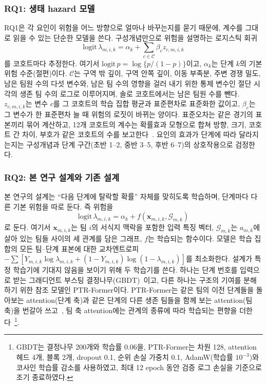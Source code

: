 \subsubsection{RQ1: 생태 hazard 모델}
\label{sec:method:rq1}
RQ1은 각 요인이 위험을 어느 방향으로 얼마나 바꾸는지를 묻기 때문에, 계수를 그대로 읽을 수 있는 단순한 모델을 쓴다.
구성개념만으로 위험을 설명하는 로지스틱 회귀
\begin{equation}
\mathrm{logit}\,\lambda_{m,i,k}=\alpha_k+\textstyle\sum_{c\in\mathcal{C}}\beta_c z_{c,m,i,k}
\label{eq:ehm}
\end{equation}
를 코호트마다 추정한다.
여기서 $\mathrm{logit}\,p=\log\{p/(1-p)\}$이고, $\alpha_k$는 단계 $k$의 기본 위험 수준(절편)이다.
$\mathcal{C}$는 구역 밖 깊이, 구역 안쪽 깊이, 이동 부족분, 주변 경쟁 밀도, 남은 팀원 수의 다섯 변수와, 남은 팀 수의 영향을 걸러 내기 위한 통제 변수인 절단 시각의 생존 팀 수의 로그로 이루어지며, 솔로 코호트에서는 남은 팀원 수를 뺀다.
$z_{c,m,i,k}$는 변수 $c$를 그 코호트의 학습 집합 평균과 표준편차로 표준화한 값이고, $\beta_c$는 그 변수가 한 표준편차 늘 때 위험의 로짓이 바뀌는 양이다.
표준오차는 같은 경기의 표본끼리 묶어 계산하고, 12개 코호트의 계수는 확률효과 모형으로 합쳐 방향, 크기, 코호트 간 차이, 부호가 같은 코호트의 수를 보고한다~\cite{DerSimonian86}.
요인의 효과가 단계에 따라 달라지는지는 구성개념과 단계 구간(초반 1--2, 중반 3--5, 후반 6--7)의 상호작용으로 검정한다.

\subsubsection{RQ2: 본 연구 설계와 기존 설계}
\label{sec:method:rq2}
본 연구의 설계는 “다음 단계에 탈락할 확률” 자체를 맞히도록 학습하며, 단계마다 다른 기본 위험을 따로 둔다.
즉 위험을
\begin{equation}
\mathrm{logit}\,\lambda_{m,i,k}=\alpha_k+f(\mathbf{x}_{m,i,k},\mathcal{G}_{m,k})
\label{eq:logit}
\end{equation}
로 둔다. 여기서 $\mathbf{x}_{m,i,k}$는 팀 $i$의 서식지 맥락을 포함한 입력 특징 벡터, $\mathcal{G}_{m,k}$는 $a_{m,k}$에 살아 있는 팀들 사이의 세 관계를 담은 그래프, $f$는 학습되는 함수이다.
모델은 학습 집합의 모든 팀--단계 표본에 대한 교차엔트로피 $-\sum[Y_{m,i,k}\log\lambda_{m,i,k}+(1-Y_{m,i,k})\log(1-\lambda_{m,i,k})]$를 최소화한다.
설계가 특정 학습기에 기대지 않음을 보이기 위해 두 학습기를 쓴다.
하나는 단계 번호를 입력으로 받는 그래디언트 부스팅 결정나무(GBDT)~\cite{Friedman01}이고, 다른 하나는 구조의 기여를 분해하기 위한 참조 모델인 PTR-Former이다.
PTR-Former는 같은 팀의 이전 단계들을 돌아보는 attention(단계 축)과 같은 단계의 다른 생존 팀들을 함께 보는 attention(팀 축)을 번갈아 쓰고~\cite{Vaswani17}, 팀 축 attention에는 관계의 종류에 따라 학습되는 편향을 더한다~\cite{Ying21}\footnote{GBDT는 결정나무 200개와 학습률 0.06을, PTR-Former는 차원 128, attention 헤드 4개, 블록 2개, dropout 0.1, 순위 손실 가중치 0.1, AdamW(학습률 $10^{-3}$)와 코사인 학습률 감소를 사용하였고, 최대 12 epoch 동안 검증 로그 손실을 기준으로 조기 종료하였다.}.


